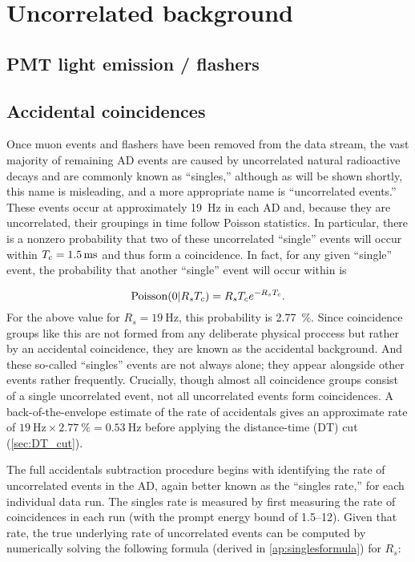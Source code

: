\section{Uncorrelated background}

\subsection{PMT light emission / flashers}
\label{subsec:flashers}

\subsection{Accidental coincidences}
\label{subsec:acc}

Once muon events and flashers have been removed from the data stream,
the vast majority of remaining AD events are caused by uncorrelated
natural radioactive decays and are commonly known as ``singles,''
although as will be shown shortly, this name is misleading,
and a more appropriate name is ``uncorrelated events.''
These events occur at approximately \SI{19}{\hertz} in each AD and,
because they are uncorrelated, their groupings in time follow Poisson statistics.
In particular, there is a nonzero probability that
two of these uncorrelated ``single'' events will occur within
$T_c=\SI{1.5}{\milli\second}$ and thus form a  coincidence.
In fact, for any given ``single'' event, the probability that
another ``single'' event will occur within \tc{} is

\begin{equation}
    \text{Poisson}(0\vert R_sT_c) = R_sT_c e^{-R_sT_c}.
\end{equation}
For the above value for $R_s=\SI{19}{\hertz}$, this probability is \SI{2.77}{\percent}.
Since  coincidence groups like this are not formed from any
deliberate physical proccess but rather by an accidental coincidence,
they are known as the accidental background.
And these so-called ``singles'' events are not always alone;
they appear alongside other events rather frequently.
Crucially, though almost all  coincidence groups
consist of a single uncorrelated event,
not all uncorrelated events form  coincidences.
A back-of-the-envelope estimate of the rate of accidentals
gives an approximate rate of
$\SI{19}{\hertz}\times\SI{2.77}{\percent}=\SI{0.53}{\hertz}$
before applying the distance-time (DT) cut (\cref{sec:DT_cut}).

The full accidentals subtraction procedure begins with identifying
the rate of uncorrelated events in the AD, again better known
as the ``singles rate,'' for each individual data run.
The singles rate is measured by first measuring the rate of
 coincidences in each run
(with the prompt energy bound of \SIrange{1.5}{12}{\mev}).
Given that rate, the true underlying rate of uncorrelated events can be
computed by numerically solving the following formula
(derived in \cref{ap:singlesformula}) for $R_s$:

